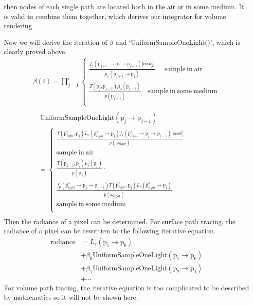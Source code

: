 \documentclass[acmtog]{acmart}
\def\w{\omega}
\def\p{\mathrm{p}}
\def\pp#1#2{\p_{#1}\rightarrow\p_{#2}}
\begin{document}
    then nodes of each single path are located both in the air or in some medium.
    It is valid to combine them together, which derives our integrator for volume rendering.\par
        Now we will derive the iteration of $\beta$ and `UniformSampleOneLight()', which is clearly proved above.
\begin{equation} \label{eq17}
\begin{split}
    \beta(i) = \prod_{j=1}^{i}
        \left\{\begin{aligned}
            \frac{f_r(\p_{j+1}\rightarrow\p_{j}\rightarrow\p_{j-1})|\mathrm{cos}\theta_j|}{p_\w(\p_{j+1}\rightarrow\p_j)}\quad\ \ \mathrm{sample\ in\ air}\\
            \frac{T(\p_j,\p_{j+1})\mu_s(\p_{j+1})}{p({\p_{j+1}})}\quad \mathrm{sample\ in\ some\ medium}\\
        \end{aligned}\right.\\
\end{split}
\end{equation}
\begin{equation} \label{eq18}
\begin{split}
    &\ \mathrm{UniformSampleOneLight}(\pp{j}{j-1})\\
    &=  \left\{\begin{aligned}
            \frac{T(\bar{\p}^s_{light},\p_j)L_e(\bar{\p}^s_{light}\rightarrow\p_j) f_r(\bar{\p}^s_{light}\rightarrow\p_j\rightarrow\p_{j-1})|\mathrm{cos}\bar{\theta}|}{p(\w_{light})}\\
            \mathrm{sample\ in\ air}\\
            \frac{T(\p_{j-1},\p_j)\mu_s(\p_j)}{p({\p_j})}\cdot\quad\quad\quad\quad\quad\quad\quad\quad\quad\quad\quad\quad\quad\quad\quad\quad\ \\
            \frac{f_p(\bar{\p}^s_{light}\rightarrow\p_j\rightarrow\p_{j-1})T(\bar{\p}^s_{light},\p_j)L_e(\bar{\p}^s_{light}\rightarrow\p_j)}{p(\w_{light})}\quad\quad\ \\
            \mathrm{sample\ in\ some\ medium}\\
        \end{aligned}\right.\\
\end{split}
\end{equation}
    Then the radiance of a pixel can be determined.
    For surface path tracing, the radiance of a pixel can be rewritten to the following iterative equation.
\begin{equation} \label{eq19}
\begin{split}
    \mathrm{radiance} &= L_e(\pp{1}{0})\\
                      &+ \beta_0\mathrm{UniformSampleOneLight(\pp{1}{0})}\\
                      &+ \beta_1\mathrm{UniformSampleOneLight(\pp{2}{1})}\\
                      &+ \cdots
\end{split}
\end{equation}
    For volume path tracing, the iterative equation is too complicated to be described by mathematics so it will not be shown here.
\end{document}
